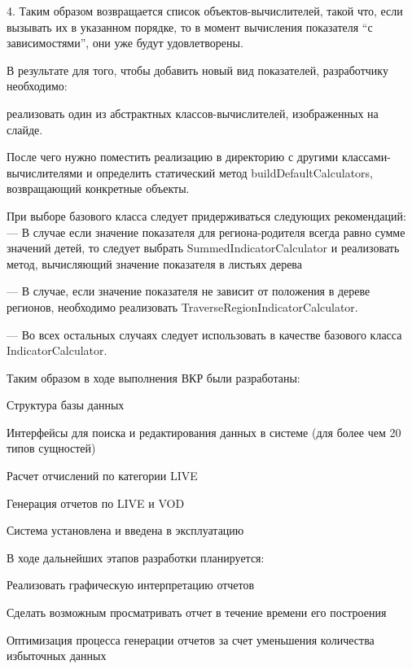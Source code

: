 \documentclass[a4paper]{article}
\begin{document}
4. Таким образом возвращается список объектов-вычислителей, такой что, если вызывать их в указанном порядке, то в момент вычисления показателя “с зависимостями”, они уже будут удовлетворены.

\newpage

В результате для того, чтобы добавить новый вид показателей, разработчику необходимо:

реализовать один из абстрактных классов-вычислителей, изображенных на слайде.

После чего нужно поместить реализацию в директорию с другими классами-вычислителями
и определить статический метод buildDefaultCalculators, возвращающий конкретные объекты.

При выборе базового класса следует придерживаться следующих рекомендаций:
--- В случае если значение показателя для региона-родителя всегда равно сумме значений детей, то следует выбрать SummedIndicatorCalculator и реализовать метод, вычисляющий значение показателя в листьях дерева

--- В случае, если значение показателя не зависит от положения в дереве регионов, необходимо реализовать TraverseRegionIndicatorCalculator.

--- Во всех остальных случаях следует использовать в качестве базового класса IndicatorCalculator.

\newpage

Таким образом в ходе выполнения ВКР были разработаны:

Структура базы данных 

Интерфейсы для поиска и редактирования данных в системе (для более чем 20 типов сущностей)

Расчет отчислений по категории LIVE

Генерация отчетов по LIVE и VOD

Система установлена и введена в эксплуатацию

\newpage
В ходе дальнейших этапов разработки планируется:

Реализовать графическую интерпретацию отчетов

Сделать возможным просматривать отчет в течение времени его построения

Оптимизация процесса генерации отчетов за счет уменьшения количества избыточных данных
\end{document}
